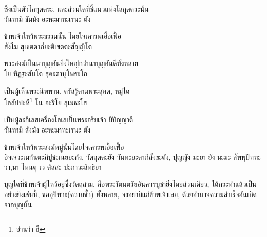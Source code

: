 \documentclass{article}
\begin{document}
ซึ่งเป็นตัวโลกุตตระ, และส่วนใดที่ชี้แนวแห่งโลกุตตระนั้น\\
วันทามิ ธัมมัง อะหะมาทะเรนะ ตัง

ข้าพเจ้าไหว้พระธรรมนั้น โดยใจเคารพเอื้อเฟื้อ\\
สังโฆ สุเขตตาภ๎ยะติเขตตะสัญญิโต

พระสงฆ์เป็นนาบุญอันยิ่งใหญ่กว่านาบุญอันดีทั้งหลาย\\
โย ทิฏฐะสันโต สุคะตานุโพธะโก

เป็นผู้เห็นพระนิพพาน, ตรัสรู้ตามพระสุคต, หมู่ใด\\
โลลัปปะหี\footnote{อ่านว่า ฮี} โน อะริโย สุเมธะโส

เป็นผู้ละกิเลสเครื่องโลเลเป็นพระอริยเจ้า มีปัญญาดี\\
วันทามิ สังฆัง อะหะมาทะเรนะ ตัง

ข้าพเจ้าไหว้พระสงฆ์หมู่นั้นโดยใจเคารพเอื้อเฟื้อ\\
อิจเจวะเมกันตะภิปูชะเนยยะกัง, วัตถุตตะยัง วันทะยะตาภิสังขะตัง,
ปุญญัง มะยา ยัง มะมะ สัพพุปัททะวา,มา โหนตุ เว ตัสสะ ปะภาวะสิทธิยา

บุญใดที่ข้าพเจ้าผู้ไหว้อยู่ซึ่งวัตถุสาม, คือพระรัตนตรัยอันควรบูชายิ่งโดยส่วนเดียว,
ได้กระทำแล้วเป็นอย่างยิ่งเช่นนี้, ขออุปัทวะ(ความชั่ว) ทั้งหลาย,
จงอย่ามีแก่ข้าพเจ้าเลย, ด้วยอำนาจความสำเร็จอันเกิดจากบุญนั้น
\end{document}
